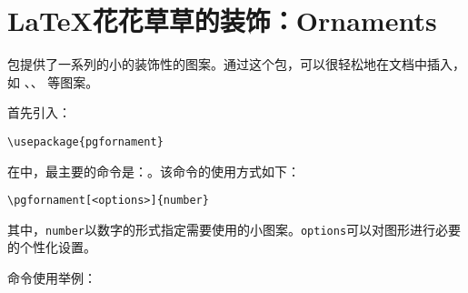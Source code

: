 \chapter{\LaTeX 花花草草的装饰：Ornaments}
	
	包提供了一系列的小的装饰性的图案。通过这个包，可以很轻松地在文档中插入，如 、、 等图案。
	
	首先引入：
\begin{verbatim}
\usepackage{pgfornament}
\end{verbatim}

在中，最主要的命令是：。该命令的使用方式如下：
\begin{verbatim}
\pgfornament[<options>]{number}
\end{verbatim}
其中，\texttt{number}以数字的形式指定需要使用的小图案。\texttt{options}可以对图形进行必要的个性化设置。

命令使用举例：

